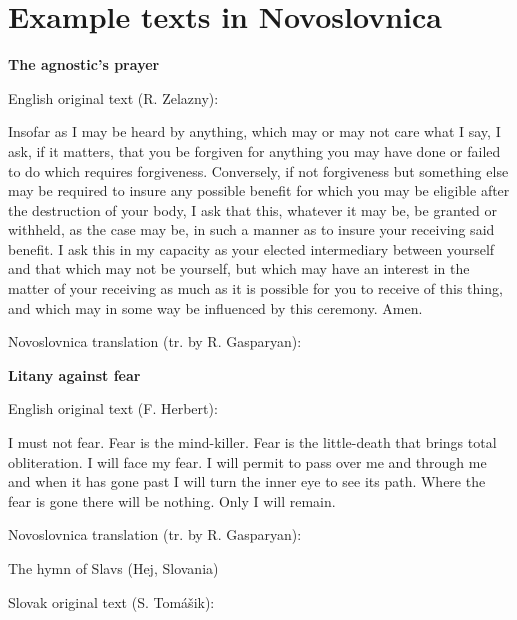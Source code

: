 \section{Example texts in Novoslovnica}


\textbf{The agnostic’s prayer}

English original text (R. Zelazny):

Insofar as I may be heard by anything, which may or may not care what I say, I ask, if it matters, that you be forgiven for anything you may have done or failed to do which requires forgiveness. Conversely, if not forgiveness but something else may be required to insure any possible benefit for which you may be eligible after the destruction of your body, I ask that this, whatever it may be, be granted or withheld, as the case may be, in such a manner as to insure your receiving said benefit. I ask this in my capacity as your elected intermediary between yourself and that which may not be yourself, but which may have an interest in the matter of your receiving as much as it is possible for you to receive of this thing, and which may in some way be influenced by this ceremony. Amen.


Novoslovnica translation (tr. by R. Gasparyan):

\textbf{Litany against fear}

English original text (F. Herbert):

I must not fear.
Fear is the mind-killer.
Fear is the little-death that brings total obliteration.
I will face my fear.
I will permit to pass over me and through me and when it has gone past I will turn the inner eye to see its path.
Where the fear is gone there will be nothing.
Only I will remain. 

Novoslovnica translation (tr. by R. Gasparyan):

The hymn of Slavs (Hej, Slovania)

Slovak original text (S. Tomášik):

